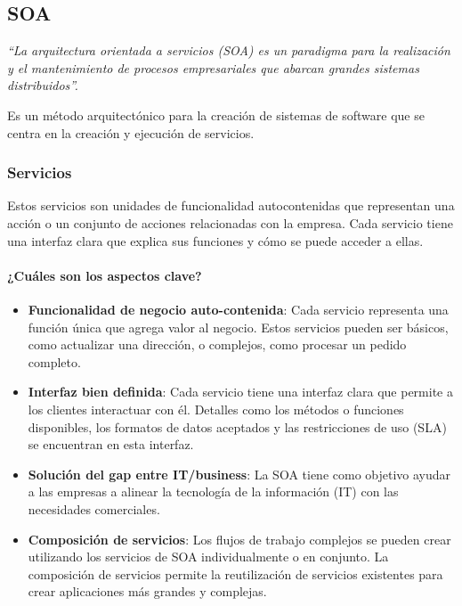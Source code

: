 \documentclass{article}
\begin{document}
		\subsection{SOA}
		\textit{``La arquitectura orientada a servicios (SOA) es un paradigma para la realización y el mantenimiento de procesos empresariales que abarcan grandes sistemas distribuidos''.}
		
		Es un método arquitectónico para la creación de sistemas de software que se centra en la creación y ejecución de servicios. 
		
		
		\subsubsection{Servicios}
		Estos servicios son unidades de funcionalidad autocontenidas que representan una acción o un conjunto de acciones relacionadas con la empresa. Cada servicio tiene una interfaz clara que explica sus funciones y cómo se puede acceder a ellas.
		
		\paragraph{¿Cuáles son los aspectos clave?}
		\begin{itemize}		
			\item \textbf{Funcionalidad de negocio auto-contenida}: Cada servicio representa una función única que agrega valor al negocio. Estos servicios pueden ser básicos, como actualizar una dirección, o complejos, como procesar un pedido completo.
			
			
			\item \textbf{Interfaz bien definida}: Cada servicio tiene una interfaz clara que permite a los clientes interactuar con él. Detalles como los métodos o funciones disponibles, los formatos de datos aceptados y las restricciones de uso (SLA) se encuentran en esta interfaz.
			
			
			\item \textbf{Solución del gap entre IT/business}: La SOA tiene como objetivo ayudar a las empresas a alinear la tecnología de la información (IT) con las necesidades comerciales.
			
			
			\item \textbf{Composición de servicios}: Los flujos de trabajo complejos se pueden crear utilizando los servicios de SOA individualmente o en conjunto. La composición de servicios permite la reutilización de servicios existentes para crear aplicaciones más grandes y complejas.
			
		\end{itemize}
		
\end{document}
